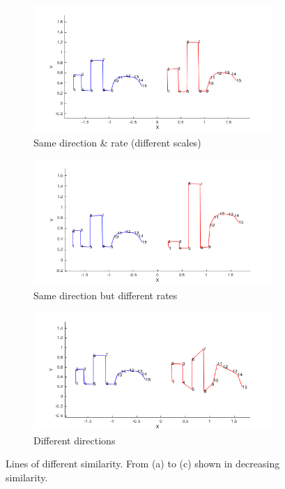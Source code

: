 \documentclass[
    floatsintext
]{article}
\begin{document}
\begin{figure}[h]
  \centering
  \begin{subfigure}{.49\textwidth}
    \includegraphics[width=1\linewidth]{./figures/similar_lines_A.png}
    \caption{Same direction \& rate (different scales)}
    \label{fig:similar_lines_A}
  \end{subfigure}
  \begin{subfigure}{.49\textwidth}
    \includegraphics[width=1\linewidth]{./figures/similar_lines_B.png}
    \caption{Same direction but different rates}
    \label{fig:similar_lines_B}
  \end{subfigure}
  \begin{subfigure}{.49\textwidth}
    \includegraphics[width=1\linewidth]{./figures/similar_lines_C.png}
    \caption{Different directions}
    \label{fig:similar_lines_C}
  \end{subfigure}
  \caption{Lines of different similarity. From (a) to (c) shown in decreasing similarity.}
\end{figure}
\end{document}
